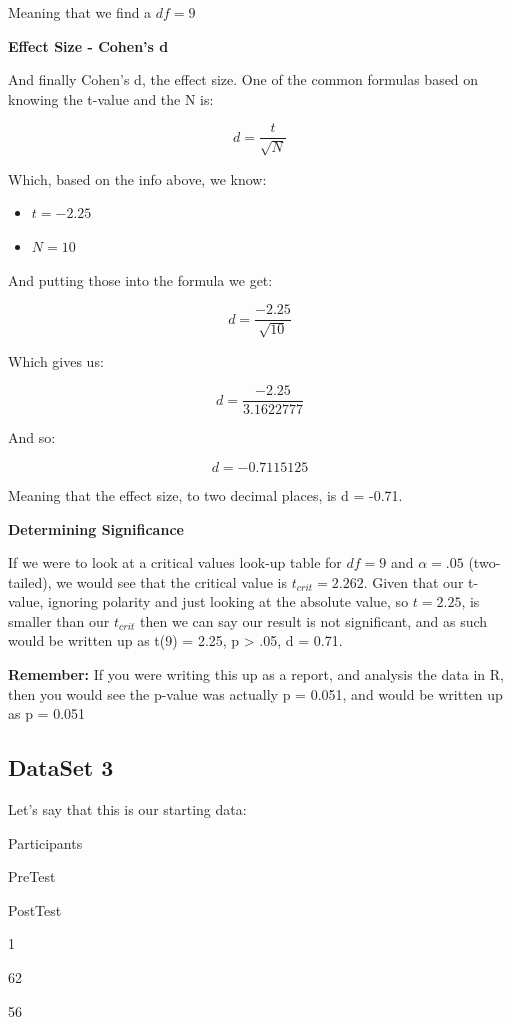 \documentclass[
  oneside]{book}
\providecommand{\tightlist}{%
  \setlength{\itemsep}{0pt}\setlength{\parskip}{0pt}}
\begin{document}
Meaning that we find a \(df = 9\)

\textbf{Effect Size - Cohen's d}

And finally Cohen's d, the effect size. One of the common formulas based on knowing the t-value and the N is:

\[d = \frac{t}{\sqrt{N}}\]

Which, based on the info above, we know:

\begin{itemize}
\tightlist
\item
  \(t = -2.25\)
\item
  \(N = 10\)
\end{itemize}

And putting those into the formula we get:

\[d = \frac{-2.25}{\sqrt{10}}\]

Which gives us:

\[d = \frac{-2.25}{3.1622777}\]

And so:

\[d = -0.7115125\]

Meaning that the effect size, to two decimal places, is d = -0.71.

\textbf{Determining Significance}

If we were to look at a critical values look-up table for \(df = 9\) and \(\alpha = .05\) (two-tailed), we would see that the critical value is \(t_{crit} = 2.262\). Given that our t-value, ignoring polarity and just looking at the absolute value, so \(t = 2.25\), is smaller than our \(t_{crit}\) then we can say our result is not significant, and as such would be written up as t(9) = 2.25, p \textgreater{} .05, d = 0.71.

\textbf{Remember:} If you were writing this up as a report, and analysis the data in R, then you would see the p-value was actually p = 0.051, and would be written up as p = 0.051

\hypertarget{dataset-3-2}{%
\subsection{DataSet 3}\label{dataset-3-2}}

Let's say that this is our starting data:

Participants

PreTest

PostTest

1

62

56
\end{document}
